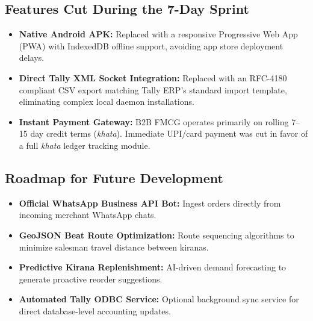 \documentclass[11pt,a4paper]{article}
\begin{document}
\subsection{Features Cut During the 7-Day Sprint}
\begin{itemize}[leftmargin=1.5cm]
    \item \textbf{Native Android APK:} Replaced with a responsive Progressive Web App (PWA) with IndexedDB offline support, avoiding app store deployment delays.
    \item \textbf{Direct Tally XML Socket Integration:} Replaced with an RFC-4180 compliant CSV export matching Tally ERP's standard import template, eliminating complex local daemon installations.
    \item \textbf{Instant Payment Gateway:} B2B FMCG operates primarily on rolling 7--15 day credit terms (\textit{khata}). Immediate UPI/card payment was cut in favor of a full \textit{khata} ledger tracking module.
\end{itemize}

\subsection{Roadmap for Future Development}
\begin{itemize}[leftmargin=1.5cm]
    \item \textbf{Official WhatsApp Business API Bot:} Ingest orders directly from incoming merchant WhatsApp chats.
    \item \textbf{GeoJSON Beat Route Optimization:} Route sequencing algorithms to minimize salesman travel distance between kiranas.
    \item \textbf{Predictive Kirana Replenishment:} AI-driven demand forecasting to generate proactive reorder suggestions.
    \item \textbf{Automated Tally ODBC Service:} Optional background sync service for direct database-level accounting updates.
\end{itemize}
\end{document}
